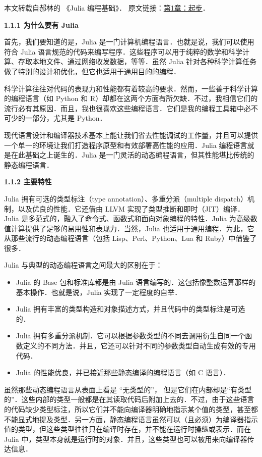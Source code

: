 
本文转载自郝林的 《Julia 编程基础》． 原文链接：\href{https://github.com/hyper0x/JuliaBasics/blob/master/book/ch01.md}{第1章：起步}．

\textbf{1.1.1 为什么要有 Julia}

首先，我们要知道的是，Julia 是一门计算机编程语言．也就是说，我们可以使用符合 Julia 语言规范的代码来编写程序．这些程序可以用于纯粹的数学和科学计算、存取本地文件、通过网络收发数据，等等．虽然 Julia 针对各种科学计算任务做了特别的设计和优化，但它也适用于通用目的的编程．

科学计算往往对代码的表现力和性能都有着较高的要求．然而，一些善于科学计算的编程语言（如 Python 和 R）却都在这两个方面有所欠缺．不过，我相信它们的流行必有其原因．而且，我也很喜欢这些编程语言．它们是我的编程工具箱中必不可少的一部分，尤其是 Python．

现代语言设计和编译器技术基本上能让我们省去性能调试的工作量，并且可以提供一个单一的环境让我们打造程序原型和有效部署高性能的应用．Julia 编程语言就是在此基础之上诞生的．Julia 是一门灵活的动态编程语言，但其性能堪比传统的静态编程语言．

\textbf{1.1.2 主要特性}

Julia 拥有可选的类型标注（type annotation）、多重分派（multiple dispatch）机制，以及优良的性能．它还借由 LLVM 实现了类型推断和即时（JIT）编译．Julia 是多范式的，融入了命令式、函数式和面向对象编程的特性．Julia 为高级数值计算提供了足够的易用性和表现力．当然，Julia 也适用于通用编程．为此，它从那些流行的动态编程语言（包括 Lisp、Perl、Python、Lua 和 Ruby）中借鉴了很多．

Julia 与典型的动态编程语言之间最大的区别在于：

\begin{itemize}
\item Julia 的 Base 包和标准库都是由 Julia 语言编写的．这包括像整数运算那样的基本操作．也就是说，Julia 实现了一定程度的自举．
\item Julia 拥有丰富的类型构造和对象描述方式，并且代码中的类型标注是可选的．
\item Julia 拥有多重分派机制．它可以根据参数类型的不同去调用衍生自同一个函数定义的不同方法．并且，它还可以针对不同的参数类型自动生成有效的专用代码．
\item Julia 的性能优良，并已接近那些静态编译的编程语言（如 C 语言）．
\end{itemize}

虽然那些动态编程语言从表面上看是 “无类型的”， 但是它们在内部却是“有类型的”．这些内部的类型一般都是在其读取代码后附加上去的．不过，由于这些语言的代码缺少类型标注，所以它们并不能向编译器明确地指示某个值的类型，甚至都不能显式地提及类型．另一方面，静态编程语言虽然可以（且必须）为编译器指示值的类型，但这些类型往往只在编译时存在，并不能在运行时操纵或表示．而在 Julia 中，类型本身就是运行时的对象．并且，这些类型也可以被用来向编译器传达信息．

